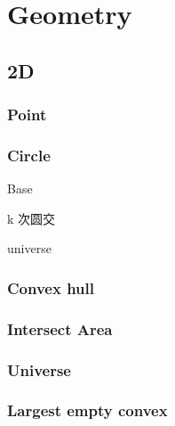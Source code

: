\section{Geometry}

\subsection{2D}

\subsubsection{Point}


\subsubsection{Circle}
Base

k 次圆交

universe


\subsubsection{Convex hull}


\subsubsection{Intersect Area}


\subsubsection{Universe}


\subsubsection{Largest empty convex}


